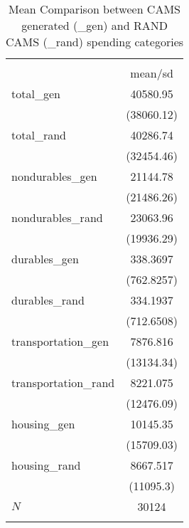 \begin{table}[htbp]\centering
\def\sym#1{\ifmmode^{#1}\else\(^{#1}\)\fi}
\caption{Mean Comparison between CAMS generated (\_gen) and RAND CAMS (\_rand) spending categories }
\begin{tabular}{l*{1}{c}}
\hline\hline
            &\\
            &     mean/sd\\
\hline
total\_gen   &    40580.95\\
            &  (38060.12)\\
total\_rand  &    40286.74\\
            &  (32454.46)\\
nondurables\_gen&    21144.78\\
            &  (21486.26)\\
nondurables\_rand&    23063.96\\
            &  (19936.29)\\
durables\_gen&    338.3697\\
            &  (762.8257)\\
durables\_rand&    334.1937\\
            &  (712.6508)\\
transportation\_gen&    7876.816\\
            &  (13134.34)\\
transportation\_rand&    8221.075\\
            &  (12476.09)\\
housing\_gen &    10145.35\\
            &  (15709.03)\\
housing\_rand&    8667.517\\
            &   (11095.3)\\
\hline
\(N\)       &       30124\\
\hline\hline
{}\\
\end{tabular}
\end{table}
